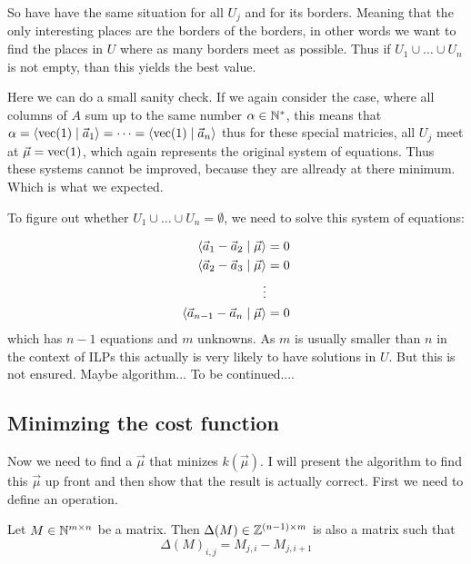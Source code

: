 So have have the same situation for all $U_j$ and for its borders. Meaning that the only interesting places are the borders of the borders, in other words we want to find the places in $U$ where as many borders meet as possible. Thus if $U_1 \cup \dots \cup U_n$ is not empty, than this yields the best value.

Here we can do a small sanity check. If we again consider the case, where all columns of $A$ sum up to the same number $\alpha \in \mathbb{N}^*$, this means that $\alpha = \langle \operatorname{vec}(1) \mid \vec a_1 \rangle = \dots = \langle \operatorname{vec}(1) \mid \vec a_n \rangle$ thus for these special matricies, all $U_j$ meet at $\vec \mu = \operatorname{vec}(1)$, which again represents the original system of equations. Thus these systems cannot be improved, because they are allready at there minimum. Which is what we expected.

To figure out whether $U_1 \cup \dots \cup U_n = \emptyset$, we need to solve this system of equations:

\begin{align*}
    \langle \vec a_1 - \vec a_2 \mid \vec \mu \rangle &= 0\\
    \langle \vec a_2 - \vec a_3 \mid \vec \mu \rangle &= 0\\
    \vdots & \\
    \langle \vec a_{n-1} - \vec a_{n} \mid \vec \mu \rangle &= 0
\end{align*}
which has $n-1$ equations and $m$ unknowns. As $m$ is usually smaller than $n$ in the context of ILPs this actually is very likely to have solutions in $U$. But this is not ensured. Maybe algorithm... To be continued....

\subsection{Minimzing the cost function}
Now we need to find a $\vec\mu$ that minizes $k(\vec\mu)$. I will present the algorithm to find this $\vec\mu$ up front and then show that the result is actually correct. First we need to define an operation. 
\begin{definition}
    Let $M \in \mathbb{N}^{m\times n}$ be a matrix. Then $\Delta(M) \in \mathbb{Z}^{(n-1)\times m}$ is also a matrix such that 
    $$\Delta(M)_{i,j} = M_{j,i} - M_{j,i+1}$$
\end{definition}

